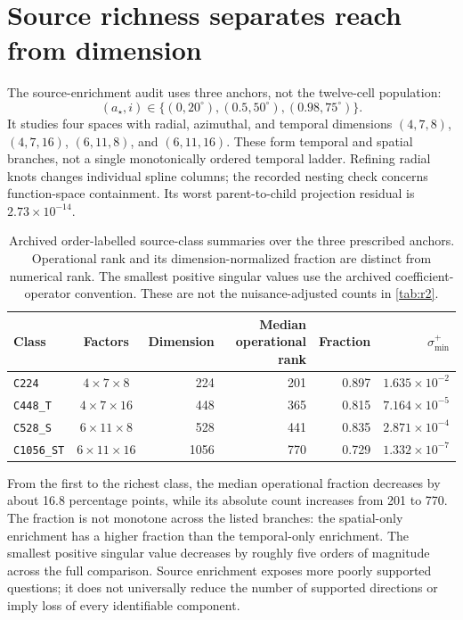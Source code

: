 \section{Source richness separates reach from dimension}\label{sec:stress}
The source-enrichment audit uses three anchors, not the twelve-cell population:
\begin{equation}
(a_\star,i)\in\{(0,20^\circ),(0.5,50^\circ),(0.98,75^\circ)\}.
\label{eq:threeanchors}
\end{equation}
It studies four spaces with radial, azimuthal, and temporal dimensions $(4,7,8)$, $(4,7,16)$, $(6,11,8)$, and $(6,11,16)$. These form temporal and spatial branches, not a single monotonically ordered temporal ladder. Refining radial knots changes individual spline columns; the recorded nesting check concerns function-space containment. Its worst parent-to-child projection residual is $2.73\times10^{-14}$.

\begin{table}[htbp]
\centering\small
\caption{Archived order-labelled source-class summaries over the three prescribed anchors. Operational rank and its dimension-normalized fraction are distinct from numerical rank. The smallest positive singular values use the archived coefficient-operator convention. These are not the nuisance-adjusted counts in \cref{tab:r2}.}
\label{tab:enrichment}
\begin{tabular}{l c r r r r}
\toprule
Class&Factors&Dimension&Median operational rank&Fraction&$\sigma_{\min}^{+}$\\
\midrule
\texttt{C224}&$4\times7\times8$&224&201&0.897&$1.635\times10^{-2}$\\
\texttt{C448\_T}&$4\times7\times16$&448&365&0.815&$7.164\times10^{-5}$\\
\texttt{C528\_S}&$6\times11\times8$&528&441&0.835&$2.871\times10^{-4}$\\
\texttt{C1056\_ST}&$6\times11\times16$&1056&770&0.729&$1.332\times10^{-7}$\\
\bottomrule
\end{tabular}
\end{table}

From the first to the richest class, the median operational fraction decreases by about 16.8 percentage points, while its absolute count increases from 201 to 770. The fraction is not monotone across the listed branches: the spatial-only enrichment has a higher fraction than the temporal-only enrichment. The smallest positive singular value decreases by roughly five orders of magnitude across the full comparison. Source enrichment exposes more poorly supported questions; it does not universally reduce the number of supported directions or imply loss of every identifiable component.

